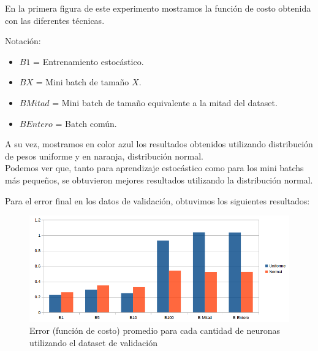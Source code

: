 En la primera figura de este experimento mostramos la función de costo obtenida con las diferentes técnicas.

Notación:
\begin{itemize}
\item $B1$ = Entrenamiento estocástico.
\item $BX$ = Mini batch de tamaño $X$.
\item $B Mitad$ = Mini batch de tamaño equivalente a la mitad del dataset.
\item $B Entero$ = Batch común.
\end{itemize}

A su vez, mostramos en color azul los resultados obtenidos utilizando distribución de pesos uniforme y en naranja, distribución normal.\\
Podemos ver que, tanto para aprendizaje estocástico como para los mini batchs más pequeños, se obtuvieron mejores resultados utilizando la distribución normal.

Para el error final en los datos de validación, obtuvimos los siguientes resultados:\\

\begin{figure}[h]
  \begin{center}
  \includegraphics[scale=0.75]{graficos/distribucion_error_validacion.png}
  \caption{Error (función de costo) promedio para cada cantidad de neuronas utilizando el dataset de validación}
  \end{center}
\end{figure}



